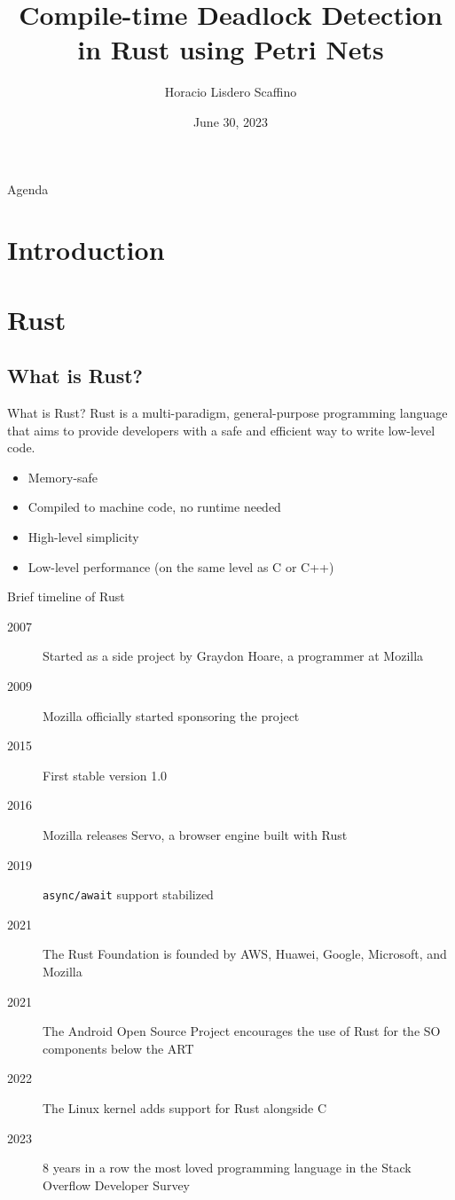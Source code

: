 \documentclass{beamer}
\title[Compile-time Deadlock Detection in Rust]{Compile-time Deadlock Detection \\ in Rust using Petri Nets}
\author{Horacio Lisdero Scaffino}
\institute[FIUBA]{Facultad de Ingeniería\\Universidad de Buenos Aires}
\date{June 30, 2023}
\begin{document}
\begin{frame}
  \titlepage
\end{frame}

\logo{}

\begin{frame}{Agenda}
  \tableofcontents
\end{frame}

\section{Introduction}

\section{Rust}

\subsection{What is Rust?}

\begin{frame}{What is Rust?}
  Rust is a multi-paradigm, general-purpose programming language that
  aims to provide developers with a safe and efficient way to write low-level code.

  \pause
  \vfill

  \begin{itemize}
    \item Memory-safe
    \item Compiled to machine code, no runtime needed
    \item High-level simplicity
    \item Low-level performance (on the same level as C or C++)
  \end{itemize}
\end{frame}

\begin{frame}{Brief timeline of Rust}
  \begin{description}
    \item [2007] Started as a side project by Graydon Hoare, a programmer at Mozilla
    \item [2009] Mozilla officially started sponsoring the project
    \item [2015] First stable version 1.0
    \item [2016] Mozilla releases Servo, a browser engine built with Rust
    \item [2019] \texttt{async/await} support stabilized
    \item [2021] The Rust Foundation is founded by AWS, Huawei, Google, Microsoft, and Mozilla
    \item [2021] The Android Open Source Project encourages the use of Rust for the SO components below the ART
    \item [2022] The Linux kernel adds support for Rust alongside C
    \item [2023] 8 years in a row the most loved programming language in the Stack Overflow Developer Survey
  \end{description}
\end{frame}
\end{document}
